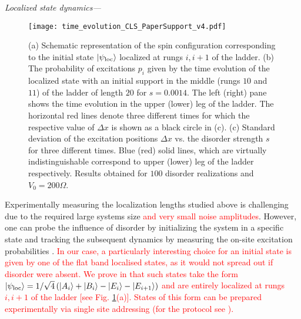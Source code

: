 \documentclass[prl,aps,twocolumn,showpacs,superscriptaddress,longbibliography]{revtex4-1}
\newcommand{\lan}{\left\langle}
\newcommand{\ran}{\right\rangle}
\newcommand{\ket}[1]{\left| #1 \ran}
\newcommand{\bra}[1]{\lan #1 \right|}
\newcommand{\changer}[1]{\textcolor{red}{#1}}
\begin{document}
\emph{Localized state dynamics---}
\begin{figure}
\texttt{[image: time\_evolution\_CLS\_PaperSupport\_v4.pdf]}
\caption{(a) Schematic representation of the spin configuration corresponding to the initial state $\ket{\psi_{\rm loc}}$ localized at rungs $i,i+1$ of the ladder. (b) The probability of excitations $p_i$ given by the time evolution of the localized state with an initial support in the middle (rungs $10$ and $11$) of the ladder of length $20$ for $s=0.0014$. The left (right) pane shows the time evolution in the upper (lower) leg of the ladder. The horizontal red lines denote three different times for which the respective value of $\Delta x$ is shown as a black circle in (c). (c) Standard deviation of the excitation positions $\Delta x$ vs. the disorder strength $s$ for three different times. Blue (red) solid lines, which are virtually indistinguishable correspond to upper (lower) leg of the ladder respectively. Results obtained for $100$ disorder realizations and $V_0=200\Omega$.}
\label{Fig:time evolution}
\end{figure}
Experimentally measuring the localization lengths studied above is challenging due to the required large systems size \changer{and very small noise amplitudes}. However, one can probe the influence of disorder by initializing the system in a specific state and tracking the subsequent dynamics by measuring the on-site excitation probabilities \cite{Schauss_2015,Labuhn_2015,Bernien2017}. \changer{In our case, a particularly interesting choice for an initial state is given by one of the flat band localised states, as it would not spread out if disorder were absent. We prove in \cite{SM} that such states take the form $\ket{\psi_{\rm loc}} = 1/\sqrt{4} \left( \ket{A_i} + \ket{B_i} - \ket{E_i} - \ket{E_{i+1}} \right)$ and are entirely localized at rungs $i,i+1$ of the ladder [see Fig. \ref{Fig:time evolution}(a)]. States of this form can be prepared experimentally via single site addressing (for the protocol see \cite{SM}).}

\end{document}
